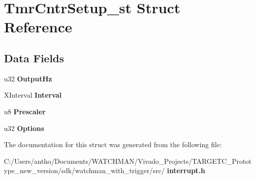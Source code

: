 \section{Tmr\+Cntr\+Setup\+\_\+st Struct Reference}
\label{struct_tmr_cntr_setup__st}
\subsection*{Data Fields}
\begin{DoxyCompactItemize}
\item 
\mbox{\label{struct_tmr_cntr_setup__st_a09e90f1e06a66bdf74ef386385c0d0de}} 
u32 {\bfseries Output\+Hz}
\item 
\mbox{\label{struct_tmr_cntr_setup__st_a244bdbbadd7f4b89879df6efa487ead8}} 
X\+Interval {\bfseries Interval}
\item 
\mbox{\label{struct_tmr_cntr_setup__st_a7a429dcd1272baccc893723d7e236ca9}} 
u8 {\bfseries Prescaler}
\item 
\mbox{\label{struct_tmr_cntr_setup__st_ae2514b28dbf5f74aa6f8a4b8621dda8b}} 
u32 {\bfseries Options}
\end{DoxyCompactItemize}


The documentation for this struct was generated from the following file\+:\begin{DoxyCompactItemize}
\item 
C\+:/\+Users/antho/\+Documents/\+W\+A\+T\+C\+H\+M\+A\+N/\+Vivado\+\_\+\+Projects/\+T\+A\+R\+G\+E\+T\+C\+\_\+\+Prototype\+\_\+new\+\_\+version/sdk/watchman\+\_\+with\+\_\+trigger/src/\textbf{ interrupt.\+h}\end{DoxyCompactItemize}
